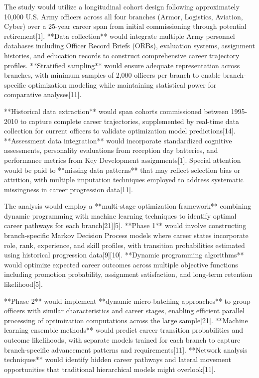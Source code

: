 \documentclass[main.tex]{subfiles}
\begin{document}

The study would utilize a longitudinal cohort design following approximately 10,000 U.S. Army officers across all four branches (Armor, Logistics, Aviation, Cyber) over a 25-year career span from initial commissioning through potential retirement[1]. **Data collection** would integrate multiple Army personnel databases including Officer Record Briefs (ORBs), evaluation systems, assignment histories, and education records to construct comprehensive career trajectory profiles. **Stratified sampling** would ensure adequate representation across branches, with minimum samples of 2,000 officers per branch to enable branch-specific optimization modeling while maintaining statistical power for comparative analyses[11].

**Historical data extraction** would span cohorts commissioned between 1995-2010 to capture complete career trajectories, supplemented by real-time data collection for current officers to validate optimization model predictions[14]. **Assessment data integration** would incorporate standardized cognitive assessments, personality evaluations from reception day batteries, and performance metrics from Key Development assignments[1]. Special attention would be paid to **missing data patterns** that may reflect selection bias or attrition, with multiple imputation techniques employed to address systematic missingness in career progression data[11].


The analysis would employ a **multi-stage optimization framework** combining dynamic programming with machine learning techniques to identify optimal career pathways for each branch[21][5]. **Phase 1** would involve constructing branch-specific Markov Decision Process models where career states incorporate role, rank, experience, and skill profiles, with transition probabilities estimated using historical progression data[9][10]. **Dynamic programming algorithms** would optimize expected career outcomes across multiple objective functions including promotion probability, assignment satisfaction, and long-term retention likelihood[5].

**Phase 2** would implement **dynamic micro-batching approaches** to group officers with similar characteristics and career stages, enabling efficient parallel processing of optimization computations across the large sample[21]. **Machine learning ensemble methods** would predict career transition probabilities and outcome likelihoods, with separate models trained for each branch to capture branch-specific advancement patterns and requirements[11]. **Network analysis techniques** would identify hidden career pathways and lateral movement opportunities that traditional hierarchical models might overlook[11].
\end{document}
